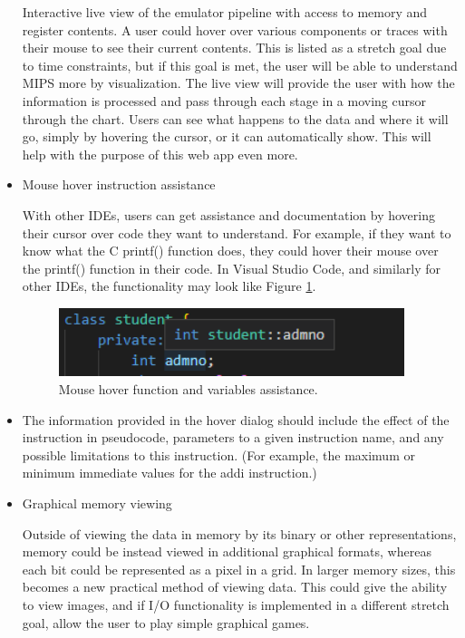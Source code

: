 \documentclass[
    paper=letter,
    parskip=half,
    fontsize=12pt,
    titlepage=firstiscover,
    toc=bibliography,
    numbers=endperiod
]{scrartcl}
\begin{document}
\begin{itemize}
          Interactive live view of the emulator pipeline with access to memory and
          register contents. A user could hover over various components or traces
          with their mouse to see their current contents. This is listed as a
          stretch goal due to time constraints, but if this goal is met, the user
          will be able to understand MIPS more by visualization. The live view
          will provide the user with how the information is processed and pass
          through each stage in a moving cursor through the chart. Users can see
          what happens to the data and where it will go, simply by hovering the
          cursor, or it can automatically show. This will help with the purpose of
          this web app even more.
    \item Mouse hover instruction assistance

          With other IDEs, users can get assistance and documentation by hovering
          their cursor over code they want to understand. For example, if they
          want to know what the C printf() function does, they could hover their
          mouse over the printf() function in their code. In Visual Studio Code,
          and similarly for other IDEs, the functionality may look like Figure
          \ref{fig:vs-code-hover-variable}.

          \begin{figure}[H]
              \includegraphics[height=2cm]{vs-code-hover-variable}
              \caption{Mouse hover function and variables assistance.}
              \label{fig:vs-code-hover-variable}
          \end{figure}

    \item The information provided in the hover dialog should include the effect
          of the instruction in pseudocode, parameters to a given instruction
          name, and any possible limitations to this instruction. (For example,
          the maximum or minimum immediate values for the addi instruction.)
    \item Graphical memory viewing

          Outside of viewing the data in memory by its binary or other
          representations, memory could be instead viewed in additional graphical
          formats, whereas each bit could be represented as a pixel in a grid. In
          larger memory sizes, this becomes a new practical method of viewing
          data. This could give the ability to view images, and if I/O
          functionality is implemented in a different stretch goal, allow the user
          to play simple graphical games.


\end{itemize}
\end{document}
